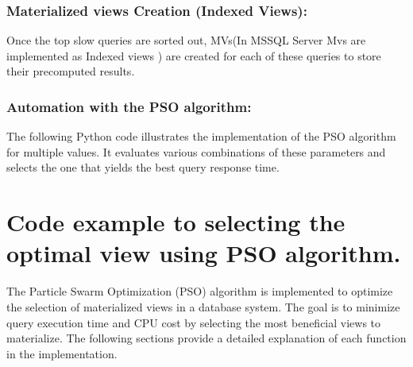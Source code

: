 \subsubsection{ Materialized views Creation (Indexed Views):}\label{Query_decomposition} Once the top slow queries are sorted out, MVs(In MSSQL Server Mvs are implemented as Indexed views ) are created for each of these queries to store their precomputed results.\vspace{.4cm}

  

  


\subsubsection{Automation with the PSO algorithm:} \label{Cost_evaluation}
 The following Python code illustrates the implementation of the PSO algorithm for multiple values. It evaluates various combinations of these parameters and selects the one that yields the best query response time.\vspace{.4cm}
 



\section*{\textbf{Code example to selecting the optimal view using PSO algorithm.} \vspace{.4cm}}


   \vspace{.4cm}



The Particle Swarm Optimization (PSO) algorithm is implemented to optimize the selection of materialized views in a database system. The goal is to minimize query execution time and CPU cost by selecting the most beneficial views to materialize. The following sections provide a detailed explanation of each function in the implementation.







